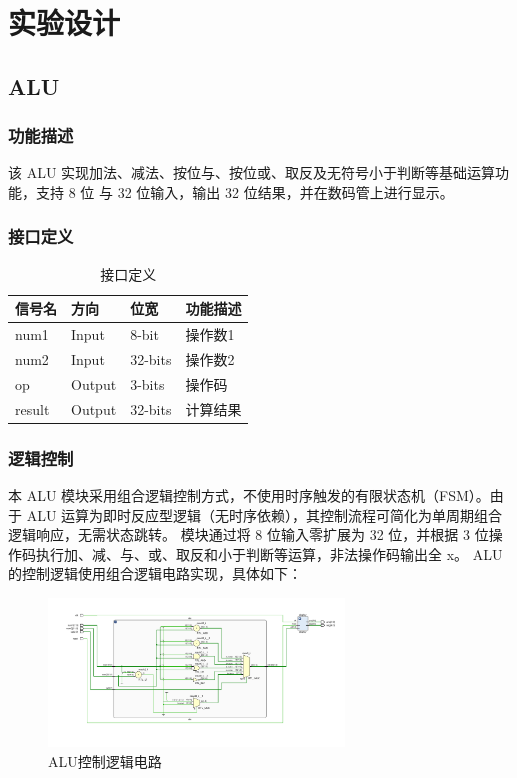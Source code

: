 \section{实验设计}
\subsection{ALU}\label{sub:alu}
\subsubsection{功能描述}
该 ALU 实现加法、减法、按位与、按位或、取反及无符号小于判断等基础运算功能，支持 8 位
与 32 位输入，输出 32 位结果，并在数码管上进行显示。
\subsubsection{接口定义}
\begin{table}[htp]
\caption{接口定义}\label{tab:signaldef}
\begin{center}
	\begin{tabular}{|l|l|l|p{6cm}|}
	\hline
	\textbf{信号名} & \textbf{方向} & \textbf{位宽} & \textbf{功能描述}\\ \hline \hline
	num1	&Input	&8-bit	&操作数1\\
	num2	&Input	&32-bits	& 操作数2\\
	op	&Output	&3-bits	& 操作码\\
	result	&Output	&32-bits & 计算结果\\
	\hline
	\end{tabular}
\end{center}
\end{table}

\subsubsection{逻辑控制}
本 ALU 模块采用组合逻辑控制方式，不使用时序触发的有限状态机（FSM）。由于 ALU 
运算为即时反应型逻辑（无时序依赖），其控制流程可简化为单周期组合逻辑响应，无需状态跳转。
模块通过将 8 位输入零扩展为 32 位，并根据 3 位操作码执行加、减、与、或、取反和小于判断等运算，非法操作码输出全 x。
ALU的控制逻辑使用组合逻辑电路实现，具体如下：
\begin{figure}[htbp]
    \centering
    \includegraphics[width=0.7\textwidth]{image/yingjian.png}
    \caption{ALU控制逻辑电路}
	\label{fig:alu_control}
\end{figure}
